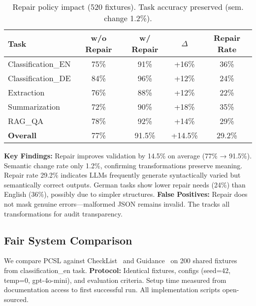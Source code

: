 \documentclass[sigconf]{acmart}
\newcommand{\breakablefunction}[1]{\texttt{\seqsplit{#1}}}
\begin{document}
\begin{table}[H]
\centering
\caption{Repair policy impact (520 fixtures). Task accuracy preserved (sem. change 1.2\%).}
\label{tab:repair_sensitivity}
\scriptsize
\begin{tabular}{@{}lcccc@{}}
\toprule
\textbf{Task} & \textbf{w/o Repair} & \textbf{w/ Repair} & \textbf{$\Delta$} & \textbf{Repair Rate} \\
\midrule
Classification\_EN & 75\% & 91\% & +16\% & 36\% \\
Classification\_DE & 84\% & 96\% & +12\% & 24\% \\
Extraction & 76\% & 88\% & +12\% & 22\% \\
Summarization & 72\% & 90\% & +18\% & 35\% \\
RAG\_QA & 78\% & 92\% & +14\% & 29\% \\
\midrule
\textbf{Overall} & 77\% & 91.5\% & +14.5\% & 29.2\% \\
\bottomrule
\end{tabular}
\end{table}

\textbf{Key Findings:} Repair improves validation by 14.5\% on average (77\% → 91.5\%).
Semantic change rate only 1.2\%, confirming transformations preserve meaning.
Repair rate 29.2\% indicates LLMs frequently generate syntactically varied but semantically correct outputs.
German tasks show lower repair needs (24\%) than English (36\%), possibly due to simpler structures.
\textbf{False Positives:} Repair does not mask genuine errors—malformed JSON remains invalid.
The \breakablefunction{repair\_ledger} tracks all transformations for audit transparency.

\subsection{Fair System Comparison}

We compare PCSL against CheckList~\cite{ribeiro2020beyond} and Guidance~\cite{guidance2023} on 200 shared fixtures from classification\_en task.
\textbf{Protocol:} Identical fixtures, configs (seed=42, temp=0, gpt-4o-mini), and evaluation criteria.
Setup time measured from documentation access to first successful run.
All implementation scripts open-sourced.
\end{document}
